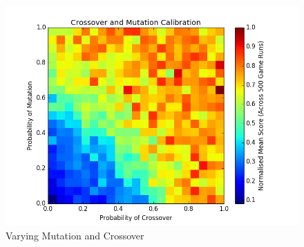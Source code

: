 \documentclass[12pt]{article}
\begin{document}
\begin{figure}[ht]
\centering
\includegraphics[width=1\textwidth]{Figures/heatmap}

\caption{Varying Mutation and Crossover}
\label{fig:calibration}
\end{figure}
\end{document}
